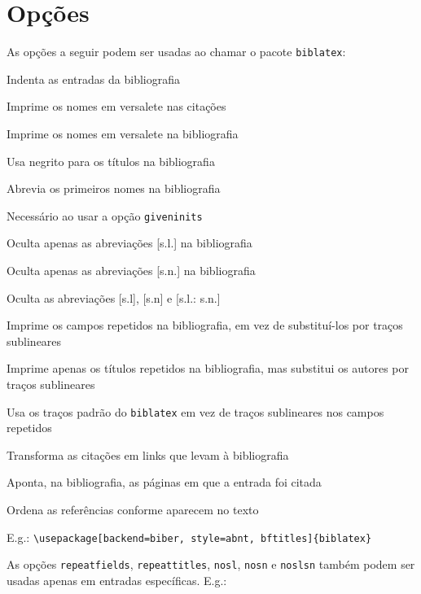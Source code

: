 \documentclass[a4paper]{article}
\begin{document}
\clearpage
\section{Opções}
\label{sec:opções}

As opções a seguir podem ser usadas ao chamar o pacote \texttt{biblatex}:

\begin{description}[parsep=8pt,itemindent=-1em,leftmargin=3em]
    \item [indent] Indenta as entradas da bibliografia
    \item [sccite] Imprime os nomes em versalete nas citações
    \item [scbib] Imprime os nomes em versalete na bibliografia
    \item [bftitles] Usa negrito para os títulos na bibliografia
    \item [giveninits] Abrevia os primeiros nomes na bibliografia
    \item [uniquename=init] Necessário ao usar a opção \texttt{giveninits}
    \item [nosl] Oculta apenas as abreviações [s.l.] na bibliografia
    \item [nosn] Oculta apenas as abreviações [s.n.] na bibliografia
    \item [noslsn] Oculta as abreviações [s.l], [s.n] e [s.l.: s.n.]
    \item [repeatfields] Imprime os campos repetidos na bibliografia, em vez de substituí-los por traços sublineares
    \item [repeattitles] Imprime apenas os títulos repetidos na bibliografia, mas substitui os autores por traços sublineares
    \item [usedashes] Usa os traços padrão do \texttt{biblatex} em vez de traços sublineares nos campos repetidos
    \item [hyperref] Transforma as citações em links que levam à bibliografia
    \item [backref] Aponta, na bibliografia, as páginas em que a entrada foi citada
    \item [sorting=none] Ordena as referências conforme aparecem no texto
\end{description}

\vspace{\baselineskip}
E.g.: \verb"\usepackage[backend=biber, style=abnt, bftitles]{biblatex}"

As opções \texttt{repeatfields}, \texttt{repeattitles}, \texttt{nosl}, \texttt{nosn} e \texttt{noslsn} também podem ser usadas apenas em entradas específicas. E.g.:
\end{document}
